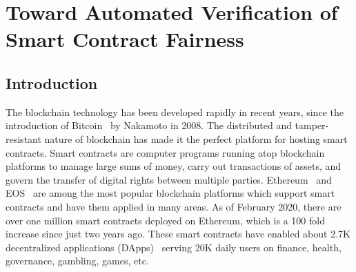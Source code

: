 
\chapter{Toward Automated Verification of Smart Contract Fairness} %
\label{ch:faircon} 

\section{Introduction}\label{Sec_Introduction}
The blockchain technology has been developed rapidly in recent years, since the introduction of
Bitcoin~\cite{nakamoto2008bitcoin} by Nakamoto in 2008.
The distributed and tamper-resistant nature of blockchain has made it the perfect platform for
hosting smart contracts.
Smart contracts are computer programs running atop blockchain platforms to manage large sums of
money, carry out transactions of assets, and govern the transfer of digital rights between multiple
parties.
Ethereum~\cite{Ethereum} and EOS~\cite{EOS} are among the most popular blockchain platforms which
support smart contracts and have them applied in many areas.
As of February 2020, there are over one million smart contracts deployed on Ethereum, which is a 100
fold increase since just two years ago.
These smart contracts have enabled about 2.7K decentralized applications (DApps)~\cite{dapp-stats}
serving 20K daily users on finance, health, governance, gambling, games, etc.
